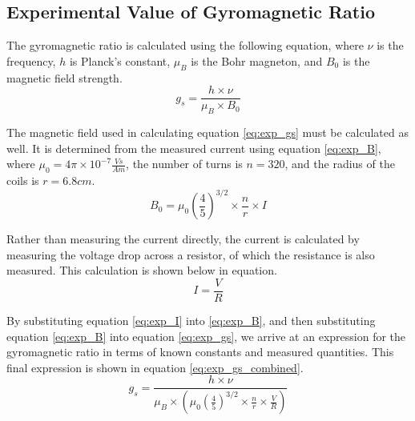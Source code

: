 \documentclass[a4paper]{article}
\begin{document}
\subsection{Experimental Value of Gyromagnetic Ratio}
\qq The gyromagnetic ratio is calculated using the following equation,
where $\nu$ is the frequency, $h$ is Planck's constant, $\mu_B$ is the
Bohr magneton, and $B_0$ is the magnetic field strength.
\begin{equation}
\label{eq:exp_gs}
g_s = \frac{h \times \nu}{\mu_B \times B_0}
\end{equation}

\qq The magnetic field used in calculating equation \ref{eq:exp_gs}
must be calculated as well. It is determined from the measured current
using equation \ref{eq:exp_B}, where $\mu_0 = 4 \pi \times 10^{-7}
\frac{Vs}{Am}$, the number of turns is $n=320$, and the radius of the
coils is $r=6.8cm$.
\begin{equation}
\label{eq:exp_B}
B_0 = \mu_0 \left( \frac{4}{5} \right) ^{3/2} \times \frac{n}{r} \times I
\end{equation}

\qq Rather than measuring the current directly, the current is
calculated by measuring the voltage drop across a resistor, of which
the resistance is also measured. This calculation is shown below in
equation.
\begin{equation}
\label{eq:exp_I}
I = \frac{V}{R}
\end{equation}

\qq By substituting equation \ref{eq:exp_I} into \ref{eq:exp_B}, and
then substituting equation \ref{eq:exp_B} into equation
\ref{eq:exp_gs}, we arrive at an expression for the gyromagnetic ratio
in terms of known constants and measured quantities. This final
expression is shown in equation \ref{eq:exp_gs_combined}.
\begin{equation}
\label{eq:exp_gs_combined}
g_s = \frac{h \times \nu}{\mu_B \times \left( \mu_0 \left( \frac{4}{5}
  \right) ^{3/2} \times \frac{n}{r} \times \frac{V}{R} \right) }
\end{equation}
\end{document}
